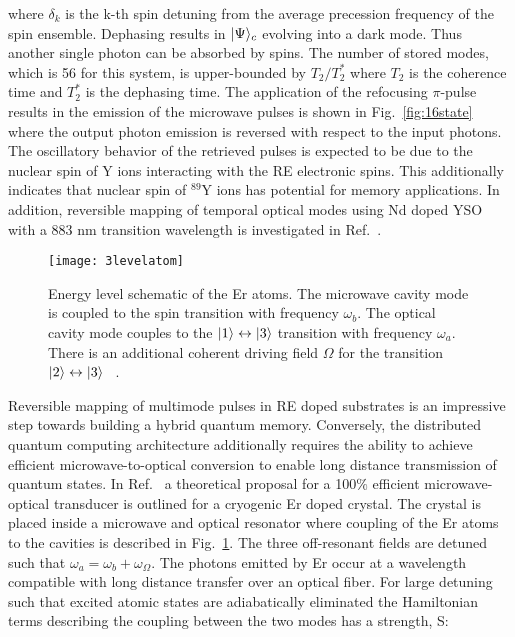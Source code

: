 where $\delta_{k}$ is the k-th spin detuning from the average precession frequency of the spin ensemble. Dephasing results in $\lvert\Psi\rangle_{c}$ evolving into a dark mode. Thus another single photon can be absorbed by spins. The number of stored modes, which is 56 for this system, is upper-bounded by $T_{2}/T_{2}^{*}$ where $T_{2}$ is the coherence time and $T_{2}^{*}$ is the dephasing time. The application of the refocusing $\pi$-pulse results in the emission of the microwave pulses is shown in Fig.~\ref{fig:16state} where the output photon emission is reversed with respect to the input photons. The oscillatory behavior of the retrieved pulses is expected to be due to the nuclear spin of Y ions interacting with the RE electronic spins. This additionally indicates that nuclear spin of $^{89}$Y ions has potential for memory applications. In addition, reversible mapping of temporal optical modes using Nd doped YSO with a 883 nm transition wavelength is investigated in Ref.~\citep{Usmani2010MappingMP}. 


\begin{figure}[h]
\centering
\texttt{[image: 3levelatom]}
\caption{\label{fig:3levelatom} Energy level schematic of the Er atoms. The microwave cavity mode is coupled to the spin transition with frequency $\omega_{b}$. The optical cavity mode couples to the $\lvert1\rangle\leftrightarrow \lvert3\rangle$ transition with frequency $\omega_{a}$. There is an additional coherent driving field $\Omega$ for the transition $\lvert2\rangle\leftrightarrow \lvert3\rangle$ ~\citep{PhysRevLett.113.203601}.}
\end{figure}


Reversible mapping of multimode pulses in RE doped substrates is an impressive step towards building a hybrid quantum memory. Conversely, the distributed quantum computing architecture additionally requires the ability to achieve efficient microwave-to-optical conversion to enable long distance transmission of quantum states. In Ref.~\citep{PhysRevLett.113.203601} a theoretical proposal for a 100$\%$ efficient microwave-optical transducer is outlined for a cryogenic Er doped crystal. The crystal is placed inside a microwave and optical resonator where coupling of the Er atoms to the cavities is described in Fig.~\ref{fig:3levelatom}. The three off-resonant fields are detuned such that $\omega_{a} = \omega_{b}+\omega_{\Omega}$. The photons emitted by Er occur at a wavelength compatible with long distance transfer over an optical fiber. For large detuning such that excited atomic states are adiabatically eliminated the Hamiltonian terms describing the coupling between the two modes has a strength, S:

